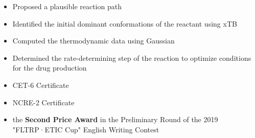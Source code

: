 \documentclass[10pt,a4paper]{altacv}
\begin{document}
\begin{itemize}
\item Proposed a plausible reaction path
\item Identified the initial dominant conformations of the reactant using xTB
\item Computed the thermodynamic data using Gaussian
\item Determined the rate-determining step of the reaction to optimize conditions for the drug production
\end{itemize}



\begin{itemize}
\item CET-6 Certificate
\item NCRE-2 Certificate
\item the \textbf{Second Price Award} in the Preliminary Round of the 2019 "FLTRP·ETIC Cup" English Writing Contest
\end{itemize}







\clearpage
\end{document}
